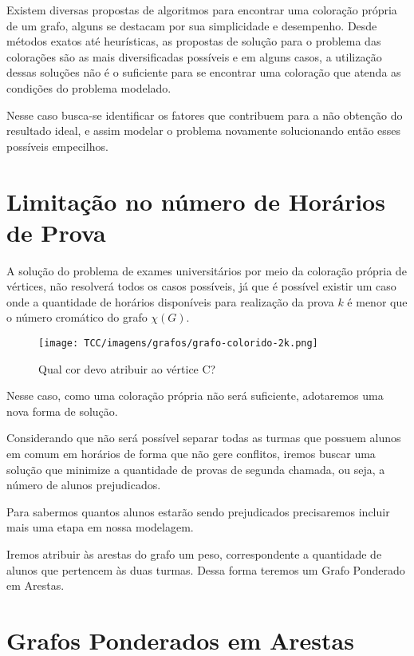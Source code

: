 
Existem diversas propostas de algoritmos para encontrar uma coloração própria de um grafo, alguns se destacam por sua simplicidade e desempenho. Desde métodos exatos até heurísticas, as propostas de solução para o problema das colorações são as mais diversificadas possíveis e em alguns casos, a utilização dessas soluções não é o suficiente para se encontrar uma coloração que atenda as condições do problema modelado.

Nesse caso busca-se identificar os fatores que contribuem para a não obtenção do resultado ideal, e assim modelar o problema novamente solucionando então esses possíveis empecilhos.

\section{Limitação no número de Horários de Prova}

A solução do problema de exames universitários por meio da coloração própria de vértices, não resolverá todos os casos possíveis, já que é possível existir um caso onde a quantidade de horários disponíveis para realização da prova $k$ é menor que o número cromático do grafo $\chi(G)$.

\begin{figure}[H]
     \centering
     \texttt{[image: TCC/imagens/grafos/grafo-colorido-2k.png]}
     \caption{Qual cor devo atribuir ao vértice C?}
     \label{grafo-k2}
\end{figure}



Nesse caso, como uma coloração própria não será suficiente, adotaremos uma nova forma de solução. 

Considerando que não será possível separar todas as turmas que possuem alunos em comum em horários de forma que não gere conflitos, iremos buscar uma solução que minimize a quantidade de provas de segunda chamada, ou seja, a número de alunos prejudicados.

Para sabermos quantos alunos estarão sendo prejudicados precisaremos incluir mais uma etapa em nossa modelagem.

Iremos atribuir às arestas do grafo um peso, correspondente a quantidade de alunos que pertencem às duas turmas. Dessa forma teremos um Grafo Ponderado em Arestas.



\section{Grafos Ponderados em Arestas}

